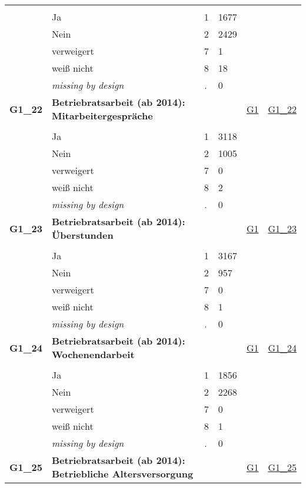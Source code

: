 \begin{longtable}{| L{2.45cm} | L{6cm} | C{1.5cm} | R{1cm} | C{2.25cm} | C{2.25cm} |}
   &  &  &  &  &  \\ 
   & Ja & 1 & 1677 &  &  \\ 
   & Nein & 2 & 2429 &  &  \\ 
   & verweigert & 7 & 1 &  &  \\ 
   & weiß nicht & 8 & 18 &  &  \\ 
   & \textit{missing by design} & \textit{.} & 0 &  &  \\ 
   \midrule
\textbf{G1\_22}\label{var:G1:22} & \textbf{Betriebratsarbeit (ab 2014): Mitarbeitergespräche} &  &  & \hyperref[G1]{G1} & \hyperref[var:suf:G1:22]{G1\_22} \\ 
   &  &  &  &  &  \\ 
   & Ja & 1 & 3118 &  &  \\ 
   & Nein & 2 & 1005 &  &  \\ 
   & verweigert & 7 & 0 &  &  \\ 
   & weiß nicht & 8 & 2 &  &  \\ 
   & \textit{missing by design} & \textit{.} & 0 &  &  \\ 
   \midrule
\textbf{G1\_23}\label{var:G1:23} & \textbf{Betriebratsarbeit (ab 2014): Überstunden} &  &  & \hyperref[G1]{G1} & \hyperref[var:suf:G1:23]{G1\_23} \\ 
   &  &  &  &  &  \\ 
   & Ja & 1 & 3167 &  &  \\ 
   & Nein & 2 & 957 &  &  \\ 
   & verweigert & 7 & 0 &  &  \\ 
   & weiß nicht & 8 & 1 &  &  \\ 
   & \textit{missing by design} & \textit{.} & 0 &  &  \\ 
   \midrule
\textbf{G1\_24}\label{var:G1:24} & \textbf{Betriebratsarbeit (ab 2014): Wochenendarbeit} &  &  & \hyperref[G1]{G1} & \hyperref[var:suf:G1:24]{G1\_24} \\ 
   &  &  &  &  &  \\ 
   & Ja & 1 & 1856 &  &  \\ 
   & Nein & 2 & 2268 &  &  \\ 
   & verweigert & 7 & 0 &  &  \\ 
   & weiß nicht & 8 & 1 &  &  \\ 
   & \textit{missing by design} & \textit{.} & 0 &  &  \\ 
   \midrule
\textbf{G1\_25}\label{var:G1:25} & \textbf{Betriebratsarbeit (ab 2014): Betriebliche Altersversorgung} &  &  & \hyperref[G1]{G1} & \hyperref[var:suf:G1:25]{G1\_25} \\ 

\end{longtable}
